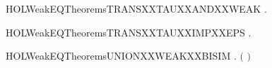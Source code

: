\newcommand{\HOLWeakEQTheoremsTRANSXXIMPXXWEAKXXTRANS}{\UseVerbatim{HOLWeakEQTheoremsTRANSXXIMPXXWEAKXXTRANS}}
\begin{SaveVerbatim}{HOLWeakEQTheoremsTRANSXXTAUXXANDXXWEAK}
\HOLTokenTurnstile{} \HOLSymConst{\HOLTokenForall{}}   .  \HOLTokenTransBegin\HOLConst{\ensuremath{\tau}}\HOLTokenTransEnd {} \HOLSymConst{\HOLTokenConj{}}  \HOLTokenWeakTransBegin{}\HOLTokenWeakTransEnd {} \HOLSymConst{\HOLTokenImp{}}  \HOLTokenWeakTransBegin{}\HOLTokenWeakTransEnd {}
\end{SaveVerbatim}
\newcommand{\HOLWeakEQTheoremsTRANSXXTAUXXANDXXWEAK}{\UseVerbatim{HOLWeakEQTheoremsTRANSXXTAUXXANDXXWEAK}}
\begin{SaveVerbatim}{HOLWeakEQTheoremsTRANSXXTAUXXIMPXXEPS}
\HOLTokenTurnstile{} \HOLSymConst{\HOLTokenForall{}} .  \HOLTokenTransBegin\HOLConst{\ensuremath{\tau}}\HOLTokenTransEnd {} \HOLSymConst{\HOLTokenImp{}}   
\end{SaveVerbatim}
\newcommand{\HOLWeakEQTheoremsTRANSXXTAUXXIMPXXEPS}{\UseVerbatim{HOLWeakEQTheoremsTRANSXXTAUXXIMPXXEPS}}
\begin{SaveVerbatim}{HOLWeakEQTheoremsUNIONXXWEAKXXBISIM}
\HOLTokenTurnstile{} \HOLSymConst{\HOLTokenForall{}} .
         \HOLSymConst{\HOLTokenConj{}}   \HOLSymConst{\HOLTokenImp{}}
        \ensuremath{(}  \ensuremath{)}
\end{SaveVerbatim}
\newcommand{\HOLWeakEQTheoremsUNIONXXWEAKXXBISIM}{\UseVerbatim{HOLWeakEQTheoremsUNIONXXWEAKXXBISIM}}
